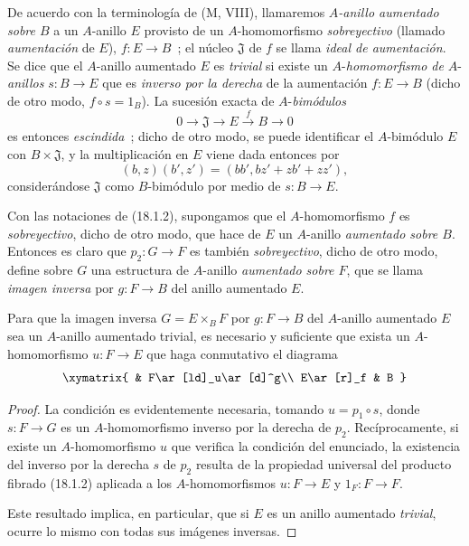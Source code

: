 \begin{env}[18.1.4]
\label{0.18.1.4-es}
De acuerdo con la terminología de (M, VIII), llamaremos
\emph{$A$-anillo aumentado sobre $B$} a un $A$-anillo $E$ provisto de un
$A$-homomorfismo \emph{sobreyectivo} (llamado \emph{aumentación} de $E$),
$f:E\to B$~; el núcleo $\mathfrak{J}$ de $f$ se llama
\emph{ideal de aumentación}. Se dice que el $A$-anillo aumentado $E$ es
\emph{trivial} si existe un $A$-\emph{homomorfismo de} $A$-\emph{anillos} $s:B\to E$
que es \emph{inverso por la derecha} de la aumentación $f:E\to B$ (dicho de otro modo,
$f\circ s=1_B$). La sucesión exacta de $A$-\emph{bimódulos}
\[
  0\longrightarrow\mathfrak{J}\longrightarrow E
  \xrightarrow{f}B\longrightarrow0
\]
es entonces \emph{escindida}~; dicho de otro modo, se puede identificar el $A$-bimódulo
$E$ con $B\times\mathfrak{J}$, y la multiplicación en $E$ viene dada entonces
por
\[
  (b,z)(b',z')=(bb',bz'+zb'+zz'),
\]
considerándose $\mathfrak{J}$ como $B$-bimódulo por medio de $s:B\to E$.
\end{env}

\begin{env}[18.1.5]
\label{0.18.1.5-es}
Con las notaciones de (18.1.2), supongamos que el $A$-homomorfismo $f$ es
\emph{sobreyectivo}, dicho de otro modo, que hace de $E$ un $A$-anillo \emph{aumentado sobre
$B$}. Entonces es claro que $p_2:G\to F$ es también \emph{sobreyectivo},
dicho de otro modo, define sobre $G$ una estructura de $A$-anillo \emph{aumentado sobre
$F$}, que se llama \emph{imagen inversa} por $g:F\to B$ del anillo
aumentado $E$.
\end{env}

\begin{proposition}[18.1.6]
\label{0.18.1.6-es}
Para que la imagen inversa $G=E\times_BF$ por $g:F\to B$ del $A$-anillo
aumentado $E$ sea un $A$-anillo aumentado trivial, es necesario y suficiente que
exista un $A$-homomorfismo $u:F\to E$ que haga conmutativo el diagrama
\[
  \xymatrix{
    & F\ar[ld]_u\ar[d]^g\\
    E\ar[r]_f & B
  }
\]
\end{proposition}

\begin{proof}
La condición es evidentemente necesaria, tomando $u=p_1\circ s$, donde
$s:F\to G$ es un $A$-homomorfismo inverso por la derecha de $p_2$. Recíprocamente,
si existe un $A$-homomorfismo $u$ que verifica la condición del enunciado,
la existencia del inverso por la derecha $s$ de $p_2$ resulta de la propiedad
universal del producto fibrado (18.1.2) aplicada a los $A$-homomorfismos
$u:F\to E$ y $1_F:F\to F$.

Este resultado implica, en particular, que si $E$ es un anillo aumentado
\emph{trivial}, ocurre lo mismo con todas sus imágenes inversas.
\end{proof}

